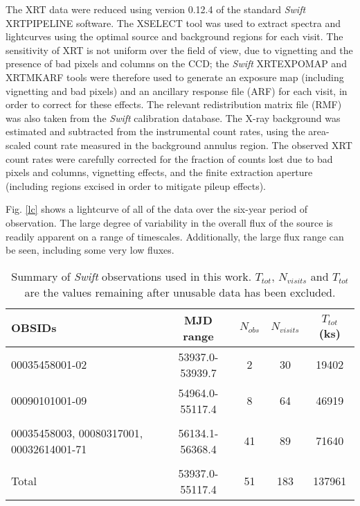 \documentclass[letters,useAMS,usenatbib]{samnote}
\begin{document}

The XRT data were reduced using version 0.12.4 of the standard {\it Swift} XRTPIPELINE software. The XSELECT tool was used to extract spectra and lightcurves
using the optimal source and background regions for each visit. The sensitivity of XRT is not uniform over the field of view, due to vignetting and the presence of bad
pixels and columns on the CCD; the {\it Swift} XRTEXPOMAP and XRTMKARF tools were therefore used to generate an exposure map (including vignetting and bad pixels) and
an ancillary response file (ARF) for each visit, in order to correct for these effects. The relevant redistribution matrix file (RMF) was also taken from the {\it Swift}
calibration database. The X-ray background was estimated and subtracted from the instrumental count rates, using the area-scaled count rate measured in the
background annulus region. The observed XRT count rates were carefully corrected for the fraction of counts lost due to bad pixels and columns, vignetting effects, and
the finite extraction aperture (including regions excised in order to mitigate pileup effects).




Fig. \ref{lc} shows a lightcurve of all of the data over the six-year period of observation. The large degree of variability in the overall flux of the source
is readily apparent on a range of timescales. Additionally, the large flux range can be seen, including some very low fluxes.

\begin{table}
 	\centering
	\begin{tabular}{| l | c | c | c | c |} \hline
		
	OBSIDs 							& MJD range 		& $N_{obs}$ 	& $N_{visits}$ 	& $T_{tot}$ (ks) 	\\ \hline \hline	
	

	00035458001-02						& 53937.0-53939.7	& 2		& 30		& 19402		\\ \hline
	00090101001-09						& 54964.0-55117.4	& 8		& 64 		& 46919		\\ \hline
	\multirow{3}{2.1cm}{00035458003, 00080317001, 00032614001-71} 	& 	&  		&  		& 		\\ 
								& 56134.1-56368.4	& 41		& 89		& 71640		\\
								&			&		&		&		\\ \hline
	
	Total							& 53937.0-55117.4	& 51		& 183		& 137961	\\ \hline

	\end{tabular}
		
	\caption{Summary of {\it Swift} observations used in this work. $T_{tot}$, $N_{visits}$ and $T_{tot}$  are the values remaining after unusable data has been
excluded.}
	\label{obstable}

\end{table}
\end{document}
